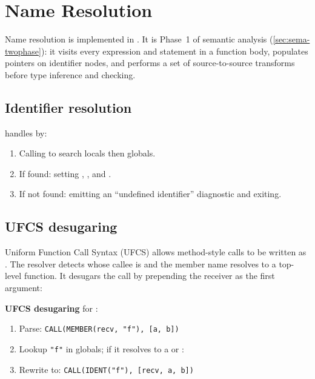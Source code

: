 \chapter{Name Resolution}
\label{chap:10-resolve}

\pnum
Name resolution is implemented in .  It is Phase~1
of semantic analysis (\cref{sec:sema-twophase}): it visits every expression and
statement in a function body, populates  pointers on identifier
nodes, and performs a set of source-to-source transforms before type inference
and checking.

\section{Identifier resolution}
\label{sec:res-ident}

\pnum
{} handles  by:
\begin{enumerate}
\item Calling  to search locals then globals.
\item If found: setting , ,
  and .
\item If not found: emitting an ``undefined identifier'' diagnostic and exiting.
\end{enumerate}

\section{UFCS desugaring}
\label{sec:res-ufcs}

\pnum
Uniform Function Call Syntax (UFCS) allows method-style calls to be written
as .  The resolver detects  whose
callee is  and the member name resolves to a top-level
function.  It desugars the call by prepending the receiver as the first argument:

\begin{algorithm}
\textbf{UFCS desugaring} for :
\begin{enumerate}
\item Parse: \texttt{CALL(MEMBER(recv, "f"), [a, b])}
\item Lookup \texttt{"f"} in globals; if it resolves to a  or
  :
\item Rewrite to: \texttt{CALL(IDENT("f"), [recv, a, b])}
\end{enumerate}
\end{algorithm}

